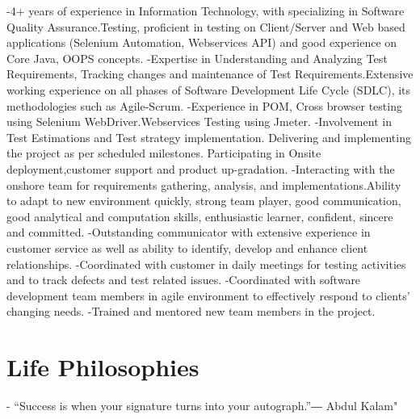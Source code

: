 \documentclass[letterpaper]{twentysecondcv} %
\begin{document}
-4+ years of experience in Information Technology, with specializing in Software Quality Assurance.Testing, proficient in testing on Client/Server and Web based applications (Selenium Automation,
Webservices API) and good experience on Core Java, OOPS concepts.
\newline-Expertise in Understanding and Analyzing Test Requirements, Tracking changes and maintenance of Test
Requirements.Extensive working experience on all phases of Software Development Life Cycle (SDLC), its methodologies such
as Agile-Scrum.
\newline-Experience in POM, Cross browser testing using Selenium WebDriver.Webservices Testing using Jmeter.
\newline-Involvement in Test Estimations and Test strategy implementation.
Delivering and implementing the project as per scheduled milestones. Participating in Onsite deployment,customer support and product up-gradation.
\newline-Interacting with the onshore team for requirements gathering, analysis, and implementations.Ability to adapt to new environment quickly, strong team player, good communication, good analytical and
computation skills, enthusiastic learner, confident, sincere and committed.
\newline-Outstanding communicator with extensive experience in customer service as well as ability to identify, develop
and enhance client relationships.
\newline-Coordinated with customer in daily meetings for testing activities and to track defects and test related issues.
\newline-Coordinated with software development team members in agile environment to effectively respond to clients' changing needs.
\newline-Trained and mentored new team members in the project.


\newline

\section{Life Philosophies}
\newline

- “Success is when your signature turns into your autograph.”―  Abdul Kalam"
%
%
%
%
\end{document}
